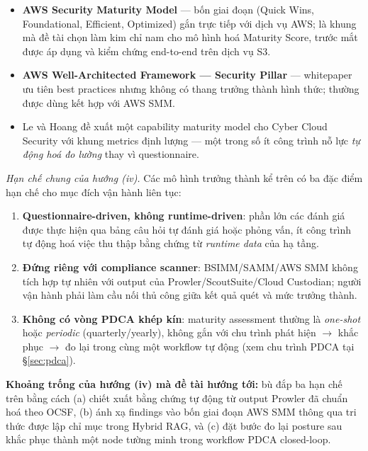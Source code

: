 \begin{itemize}
  \item \textbf{AWS Security Maturity Model} \cite{aws_smm} --- bốn giai đoạn (Quick Wins, Foundational, Efficient, Optimized) gắn trực tiếp với dịch vụ AWS; là khung mà đề tài chọn làm kim chỉ nam cho mô hình hoá Maturity Score, trước mắt được áp dụng và kiểm chứng end-to-end trên dịch vụ S3.
  \item \textbf{AWS Well-Architected Framework --- Security Pillar} \cite{aws_well_architected_security} --- whitepaper ưu tiên best practices nhưng không có thang trưởng thành hình thức; thường được dùng kết hợp với AWS SMM.
  \item Le và Hoang \cite{le2021automated_maturity} đề xuất một capability maturity model cho Cyber Cloud Security với khung metrics định lượng --- một trong số ít công trình nỗ lực \textit{tự động hoá đo lường} thay vì questionnaire.
\end{itemize}

\noindent\textit{Hạn chế chung của hướng (iv).} Các mô hình trưởng thành kể trên có ba đặc điểm hạn chế cho mục đích vận hành liên tục:
\begin{enumerate}
  \item \textbf{Questionnaire-driven, không runtime-driven}: phần lớn các đánh giá được thực hiện qua bảng câu hỏi tự đánh giá hoặc phỏng vấn, ít công trình tự động hoá việc thu thập bằng chứng từ \textit{runtime data} của hạ tầng.
  \item \textbf{Đứng riêng với compliance scanner}: BSIMM/SAMM/AWS SMM không tích hợp tự nhiên với output của Prowler/ScoutSuite/Cloud Custodian; người vận hành phải làm cầu nối thủ công giữa kết quả quét và mức trưởng thành.
  \item \textbf{Không có vòng PDCA khép kín}: maturity assessment thường là \textit{one-shot} hoặc \textit{periodic} (quarterly/yearly), không gắn với chu trình phát hiện $\rightarrow$ khắc phục $\rightarrow$ đo lại trong cùng một workflow tự động (xem chu trình PDCA tại §\ref{sec:pdca}).
\end{enumerate}

\noindent\textbf{Khoảng trống của hướng (iv) mà đề tài hướng tới:} bù đắp ba hạn chế trên bằng cách (a) chiết xuất bằng chứng tự động từ output Prowler đã chuẩn hoá theo OCSF, (b) ánh xạ findings vào bốn giai đoạn AWS SMM thông qua tri thức được lập chỉ mục trong Hybrid RAG, và (c) đặt bước đo lại posture sau khắc phục thành một node tường minh trong workflow PDCA closed-loop.

